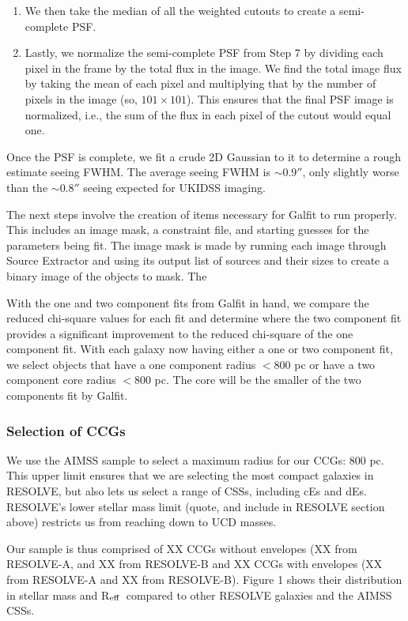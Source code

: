 \documentclass[iop,apj,twocolappendix]{emulateapj}
\newcommand{\Reff}{R$_{\rm eff}$}
\begin{document}
\begin{enumerate}
\item We then take the median of all the weighted cutouts to create a semi-complete PSF.

\item Lastly, we normalize the semi-complete PSF from Step 7 by dividing each pixel in the frame by the total flux in the image. We find the total image flux by taking the mean of each pixel and multiplying that by the number of pixels in the image (so, $101\times101$). This ensures that the final PSF image is normalized, i.e., the sum of the flux in each pixel of the cutout would equal one.    

\end{enumerate}

\noindent Once the PSF is complete, we fit a crude 2D Gaussian to it to determine a rough estimate seeing FWHM. The average seeing FWHM is $\sim 0.9''$, only slightly worse than the $\sim 0.8''$ seeing expected for UKIDSS imaging. 

The next steps involve the creation of items necessary for Galfit to run properly. This includes an image mask, a constraint file, and starting guesses for the parameters being fit. The image mask is made by running each image through Source Extractor and using its output list of sources and their sizes to create a binary image of the objects to mask. The 


With the one and two component fits from Galfit in hand, we compare the reduced chi-square values for each fit and determine where the two component fit provides a significant improvement to the reduced chi-square of the one component fit. With each galaxy now having either a one or two component fit, we select objects that have a one component radius $<800$ pc  or have a two component core radius $<800$ pc. The core will be the smaller of the two components fit by Galfit. 

\subsubsection{Selection of CCGs}
\label{ccgsel}

\noindent We use the AIMSS sample to select a maximum radius for our CCGs: 800 pc. This upper limit ensures that we are selecting the most compact galaxies in RESOLVE, but also lets us select a range of CSSs, including cEs and dEs. RESOLVE's lower stellar mass limit (quote, and include in RESOLVE section above) restricts us from reaching down to UCD masses.

Our sample is thus comprised of XX CCGs without envelopes (XX from RESOLVE-A, and XX from RESOLVE-B and XX CCGs with envelopes (XX from RESOLVE-A and XX from RESOLVE-B). Figure 1 shows their distribution in stellar mass and \Reff\ compared to other RESOLVE galaxies and the AIMSS CSSs. 
\end{document}
